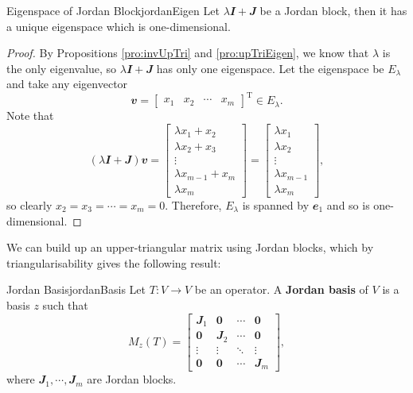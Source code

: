 \documentclass[math]{amznotes}
\theoremstyle{remark}
\newcommand{\zero}{\mathbf{0}}
\begin{document}
\begin{probox}{Eigenspace of Jordan Block}{jordanEigen}
    Let $\lambda\mathbfit{I} + \mathbfit{J}$ be a Jordan block, then it has a unique eigenspace which is one-dimensional.
    \tcblower
    \begin{proof}
        By Propositions \ref{pro:invUpTri} and \ref{pro:upTriEigen}, we know that $\lambda$ is the only eigenvalue, so $\lambda\mathbfit{I} + \mathbfit{J}$ has only one eigenspace. Let the eigenspace be $E_\lambda$ and take any eigenvector 
        \begin{equation*}
            \mathbfit{v} = \begin{bmatrix}
                x_1 & x_2 & \cdots & x_m
            \end{bmatrix}^{\mathrm{T}} \in E_\lambda.
        \end{equation*}
        Note that 
        \begin{equation*}
            (\lambda\mathbfit{I} + \mathbfit{J})\mathbfit{v} = \begin{bmatrix}
                \lambda x_1 + x_2 \\
                \lambda x_2 + x_3 \\
                \vdots \\
                \lambda x_{m - 1} + x_m \\
                \lambda x_m
            \end{bmatrix} = \begin{bmatrix}
                \lambda x_1 \\
                \lambda x_2 \\
                \vdots \\
                \lambda x_{m - 1} \\
                \lambda x_m
            \end{bmatrix},
        \end{equation*}
        so clearly $x_2 = x_3 = \cdots = x_m = 0$. Therefore, $E_\lambda$ is spanned by $\mathbfit{e}_1$ and so is one-dimensional.
    \end{proof}
\end{probox}
We can build up an upper-triangular matrix using Jordan blocks, which by triangularisability gives the following result:
\begin{dfnbox}{Jordan Basis}{jordanBasis}
    Let $T \colon V \to V$ be an operator. A {\color{red} \textbf{Jordan basis}} of $V$ is a basis $z$ such that 
    \begin{equation*}
        M_z(T) = \begin{bmatrix}
            \mathbfit{J}_1 & \zero & \cdots & \zero \\
            \zero & \mathbfit{J}_2 & \cdots & \zero \\
            \vdots & \vdots & \ddots & \vdots \\
            \zero & \zero & \cdots & \mathbfit{J}_m
        \end{bmatrix},
    \end{equation*}
    where $\mathbfit{J}_1, \cdots, \mathbfit{J}_m$ are Jordan blocks.
\end{dfnbox}
\end{document}
